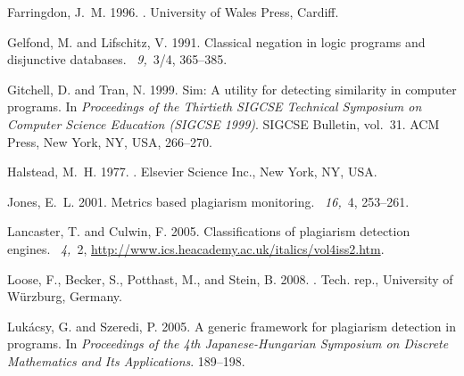 \documentclass{tlp}
\begin{document}
\begin{thebibliography}{}
{\sc Farringdon, J.~M.} 1996.
.
\newblock University of Wales Press, Cardiff.

{\sc Gelfond, M.} {\sc and} {\sc Lifschitz, V.} 1991.
\newblock Classical negation in logic programs and disjunctive databases.
~{\em 9,\/}~3/4, 365--385.

{\sc Gitchell, D.} {\sc and} {\sc Tran, N.} 1999.
\newblock Sim: {A} utility for detecting similarity in computer programs.
\newblock In {\em Proceedings of the Thirtieth SIGCSE Technical Symposium on
  Computer Science Education {\rm (}SIGCSE 1999{\rm )}}. SIGCSE Bulletin,
  vol.~31. ACM Press, New York, NY, USA, 266--270.

{\sc Halstead, M.~H.} 1977.
.
\newblock Elsevier Science Inc., New York, NY, USA.

{\sc Jones, E.~L.} 2001.
\newblock Metrics based plagiarism monitoring.
~{\em 16,\/}~4,
  253--261.

{\sc Lancaster, T.} {\sc and} {\sc Culwin, F.} 2005.
\newblock Classifications of plagiarism detection engines.
~{\em 4,\/}~2, \url{http://www.ics.heacademy.ac.uk/italics/vol4iss2.htm}.

{\sc Loose, F.}, {\sc Becker, S.}, {\sc Potthast, M.}, {\sc and} {\sc Stein,
  B.} 2008.
.
\newblock Tech. rep., University of W\"{u}rzburg, Germany.

{\sc Luk\'{a}csy, G.} {\sc and} {\sc Szeredi, P.} 2005.
\newblock A generic framework for plagiarism detection in programs.
\newblock In {\em Proceedings of the 4th Japanese-Hungarian Symposium on
  Discrete Mathematics and Its Applications}. 189--198.


\end{thebibliography}
\end{document}
